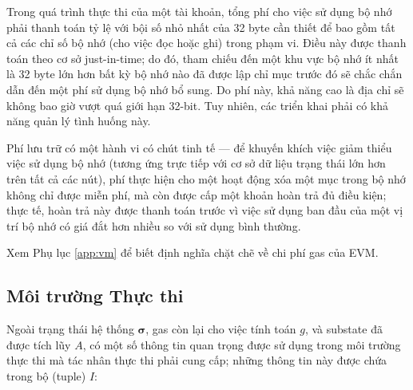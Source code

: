 \documentclass[9pt,oneside]{amsart}
\begin{document}
\begin{multicols}{2}
Trong quá trình thực thi của một tài khoản, tổng phí cho việc sử dụng bộ nhớ phải thanh toán tỷ lệ với bội số nhỏ nhất của 32 byte cần thiết để bao gồm tất cả các chỉ số bộ nhớ (cho việc đọc hoặc ghi) trong phạm vi. Điều này được thanh toán theo cơ sở just-in-time; do đó, tham chiếu đến một khu vực bộ nhớ ít nhất là 32 byte lớn hơn bất kỳ bộ nhớ nào đã được lập chỉ mục trước đó sẽ chắc chắn dẫn đến một phí sử dụng bộ nhớ bổ sung. Do phí này, khả năng cao là địa chỉ sẽ không bao giờ vượt quá giới hạn 32-bit. Tuy nhiên, các triển khai phải có khả năng quản lý tình huống này.

Phí lưu trữ có một hành vi có chút tinh tế --- để khuyến khích việc giảm thiểu việc sử dụng bộ nhớ (tương ứng trực tiếp với cơ sở dữ liệu trạng thái lớn hơn trên tất cả các nút), phí thực hiện cho một hoạt động xóa một mục trong bộ nhớ không chỉ được miễn phí, mà còn được cấp một khoản hoàn trả đủ điều kiện; thực tế, hoàn trả này được thanh toán trước vì việc sử dụng ban đầu của một vị trí bộ nhớ có giá đắt hơn nhiều so với sử dụng bình thường.

Xem Phụ lục \ref{app:vm} để biết định nghĩa chặt chẽ về chi phí gas của EVM.

\subsection{Môi trường Thực thi}\label{exec_env}

Ngoài trạng thái hệ thống \(\boldsymbol{\sigma}\), gas còn lại cho việc tính toán \(g\), và substate đã được tích lũy \(A\), có một số thông tin quan trọng được sử dụng trong môi trường thực thi mà tác nhân thực thi phải cung cấp; những thông tin này được chứa trong bộ (tuple) \(I\):


\end{multicols}
\end{document}
